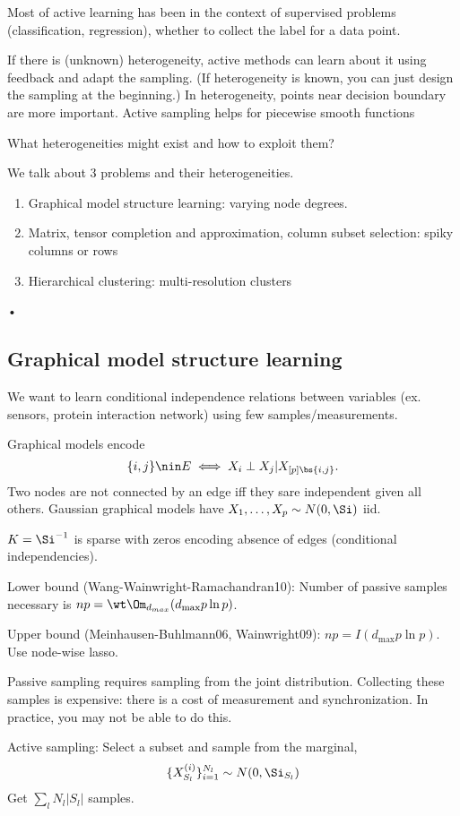 Most of active learning has been in the context of supervised problems (classification, regression), whether to collect the label for a data point. 

If there is (unknown) heterogeneity, active methods can learn about it using feedback and adapt the sampling.  (If heterogeneity is known, you can just design the sampling at the beginning.)
In heterogeneity, points near decision boundary are more important.
Active sampling helps for piecewise smooth functions

What heterogeneities might exist and how to exploit them?

We talk about 3 problems and their heterogeneities.
\begin{enumerate}
\item
Graphical model structure learning: varying node degrees.
\item
Matrix, tensor completion and approximation, column subset selection: spiky columns or rows
\item
Hierarchical clustering: multi-resolution clusters
\end{enumerate}•

\subsection{Graphical model structure learning}

We want to learn conditional independence relations between variables (ex. sensors, protein interaction network) using few samples/measurements.

Graphical models encode
$$
\{i,j\}\nin E\iff X_i\perp X_j|X_{[p]\bs\{i,j\}}.
$$
Two nodes are not connected by an edge iff they sare independent given all others.
Gaussian graphical models have $X_1,\ldots, X_p\sim N(0,\Si)$ iid.

$K=\Si^{-1}$ is sparse with zeros encoding absence of edges (conditional independencies).

Lower bound (Wang-Wainwright-Ramachandran10): Number of passive samples necessary is $np=\wt\Om_{d_{max}}(d_{\max}p\ln p)$. 

Upper bound (Meinhausen-Buhlmann06, Wainwright09): $np=I(d_{\max} p\ln p)$. Use node-wise lasso.

Passive sampling requires sampling from the joint distribution. Collecting these samples is expensive: there is a cost of measurement and synchronization.
In practice, you may not be able to do this.

Active sampling: Select a subset and sample from the marginal,
$$
\{X_{S_l}^{(i)}\}_{i=1}^{N_l}\sim N(0,\Si_{S_l})
$$
Get $\sum_l N_l|S_l|$ samples. 

